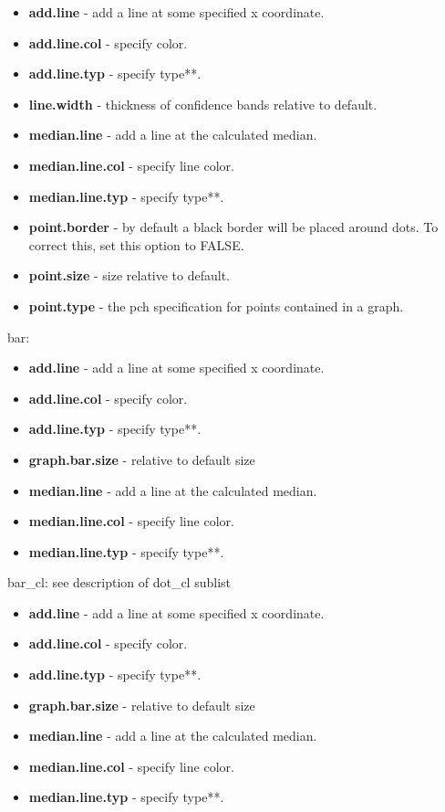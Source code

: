 \documentclass{article}
\begin{document}
\begin{itemize}
\item \textbf{add.line} - add a line at some specified x coordinate.
\item \textbf{add.line.col} - specify color.
\item \textbf{add.line.typ} - specify type**.
\item \textbf{line.width} - thickness of confidence bands relative to default.
\item \textbf{median.line} - add a line at the calculated median.
\item \textbf{median.line.col} - specify line color.
\item \textbf{median.line.typ} - specify type**.
\item \textbf{point.border} - by default a black border will be placed around dots. To correct this, set this option to FALSE.
\item \textbf{point.size} - size relative to default.
\item \textbf{point.type} - the pch specification for points contained in a graph.
\end{itemize}
bar:
\begin{itemize}
\item \textbf{add.line} - add a line at some specified x coordinate.
\item \textbf{add.line.col} - specify color.
\item \textbf{add.line.typ} - specify type**.
\item \textbf{graph.bar.size} - relative to default size
\item \textbf{median.line} - add a line at the calculated median.
\item \textbf{median.line.col} - specify line color.
\item \textbf{median.line.typ} - specify type**.
\end{itemize}
bar\_cl: see description of dot\_cl sublist
\begin{itemize}
\item \textbf{add.line} - add a line at some specified x coordinate.
\item \textbf{add.line.col} - specify color.
\item \textbf{add.line.typ} - specify type**.
\item \textbf{graph.bar.size} - relative to default size
\item \textbf{median.line} - add a line at the calculated median.
\item \textbf{median.line.col} - specify line color.
\item \textbf{median.line.typ} - specify type**.
\end{itemize}
\end{document}
